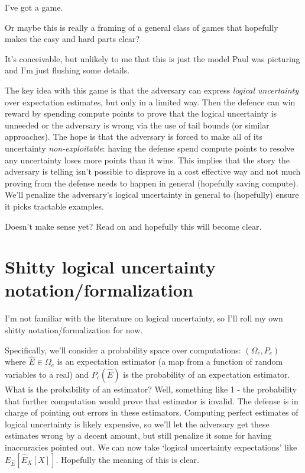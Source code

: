 \documentclass{pset}
\begin{document}
I've got a game. 

Or maybe this is really a framing of a general class of games that hopefully
makes the easy and hard parts clear?

It's conceivable, but unlikely to me that this is just the model Paul was
picturing and I'm just flushing some details.

The key idea with this game is that the adversary can express \textit{logical
uncertainty} over expectation estimates, but only in a limited way. Then the
defence can win reward by spending compute points to prove that the logical
uncertainty is unneeded or the adversary is wrong via the use of tail bounds
(or similar approaches). The hope is that the adversary is forced to make all
of its uncertainty \textit{non-exploitable}: having the defense spend compute
points to resolve any uncertainty loses more points than it wins. This implies
that the story the adversary is telling isn't possible to disprove in a cost
effective way and not much proving from the defense needs to happen in general
(hopefully saving compute). We'll penalize the adversary's logical uncertainty
in general to (hopefully) ensure it picks tractable examples. 

Doesn't make sense yet? Read on and hopefully this will become clear.

\section{Shitty logical uncertainty notation/formalization}

I'm not familiar with the literature on logical uncertainty, so I'll roll my
own shitty notation/formalization for now.

Specifically, we'll consider a probability space over computations: $(\Omega_c,
P_c)$ where $\hat{E} \in \Omega_c$ is an expectation estimator (a map from a
function of random variables to a real) and $P_c(\hat{E})$ is the probability
of an expectation estimator. What is the probability of an estimator?
Well, something like 1 - the probability that further computation would
prove that estimator is invalid. The defense is in charge of pointing
out errors in these estimators. Computing perfect estimates of
logical uncertainty is likely expensive, so we'll let the adversary get
these estimates wrong by a decent amount, but still penalize it
some for having inaccuracies pointed out.
We can now take `logical uncertainty expectations'
like $E_{\hat{E}}[\hat{E}_X[X]]$. Hopefully the meaning of this is clear.
\end{document}
